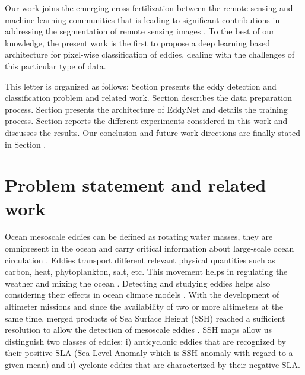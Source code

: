 \documentclass[journal]{IEEEtran}
\begin{document}
Our work joins the emerging cross-fertilization between the remote sensing and machine learning communities that is leading to significant contributions in addressing the segmentation of remote sensing images \cite{maggiori,audebert2016semantic,volpi2017dense}. To the best of our knowledge, the present work is the first to propose a deep learning based architecture for pixel-wise classification of eddies, dealing with the challenges of this particular type of data.

This letter is organized as follows: Section \uppercase\expandafter{} presents the eddy detection and classification problem and related work. Section \uppercase\expandafter{} describes the data preparation process. Section \uppercase\expandafter{} presents the architecture of EddyNet and details the training process. Section \uppercase\expandafter{} reports the different experiments considered in this work and discusses the results. Our conclusion and future work directions are finally stated in Section \uppercase\expandafter{}. 

\section{Problem statement and related work}

Ocean mesoscale eddies can be defined as rotating water masses, they are omnipresent in the ocean and carry critical information about large-scale ocean circulation \cite{holland1978role,chelton2011global}. Eddies transport different relevant physical quantities such as carbon, heat, phytoplankton, salt, etc. This movement helps in regulating the weather and mixing the ocean \cite{mcwilliams2008nature}. Detecting and studying eddies helps also considering their effects in ocean climate models \cite{le2011parameterization}. With the development of altimeter missions and since the availability of two or more altimeters at the same time, merged products of Sea Surface Height (SSH) reached a sufficient resolution to allow the detection of mesoscale eddies \cite{faghmous2015daily,pascual2006improved}. SSH maps allow us distinguish two classes of eddies: i) anticyclonic eddies that are recognized by their positive SLA (Sea Level Anomaly which is SSH anomaly with regard to a given mean) and ii) cyclonic eddies that are characterized by their negative SLA.
 
\end{document}

